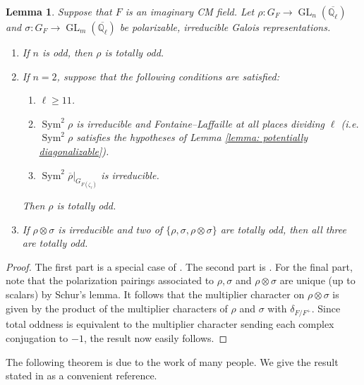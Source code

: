 \documentclass{amsart}
\newtheorem{lemma}[theorem]{Lemma}
\theoremstyle{definition}
\numberwithin{equation}{section} %
\newcommand{\GL}{\operatorname{GL}}
\newcommand{\Sym}{\operatorname{Sym}}
\newcommand{\Qlbar}{\ensuremath{\overline{\mathbb{Q}_\ell}}}
\begin{document}
\begin{lemma} \label{lemma: oddness}
Suppose that $F$ is an imaginary CM field.
Let $\rho: G_F \to \GL_n(\Qlbar)$ and $\sigma: G_F \to \GL_m(\Qlbar)$ be polarizable, irreducible Galois representations.
\begin{enumerate}
    \item If $n$ is odd, then $\rho$ is totally odd.
    \item If $n = 2$, suppose that the following conditions are satisfied:
    \begin{enumerate}[label=(\roman*)]
        \item $\ell \geq 11$.
        \item $\Sym^2 \rho$ is irreducible and Fontaine--Laffaille at all places dividing $\ell$ (i.e. $\Sym^2 \rho$ satisfies the hypotheses of Lemma \ref{lemma: potentially diagonalizable}).
        \item $\Sym^2 \overline{\rho}|_{G_{F(\zeta_\ell)}}$ is irreducible.
    \end{enumerate}
    Then $\rho$ is totally odd.
        \item If $\rho \otimes \sigma$ is irreducible and two of $\{\rho, \sigma, \rho \otimes \sigma\}$ are totally odd, then all three are totally odd.
\end{enumerate}
\end{lemma}
\begin{proof}
The first part is a special case of \cite[Lemma 1.5.3]{CEG22}.
The second part is \cite[Lemma 3.4.1]{CEG22}.
For the final part, note that the polarization pairings associated to $\rho, \sigma$ and $\rho \otimes \sigma$ are unique (up to scalars) by Schur's lemma.
It follows that the multiplier character on $\rho \otimes \sigma$ is given by the product of the multiplier characters of $\rho$ and $\sigma$ with $\delta_{F/F^+}$.
Since total oddness is equivalent to the multiplier character sending each complex conjugation to $-1$, the result now easily follows. 
\end{proof}

The following theorem is due to the work of many people. We give the result stated in \cite[Theorem 2.1.1]{BLGGT14} as a convenient reference.
\end{document}
